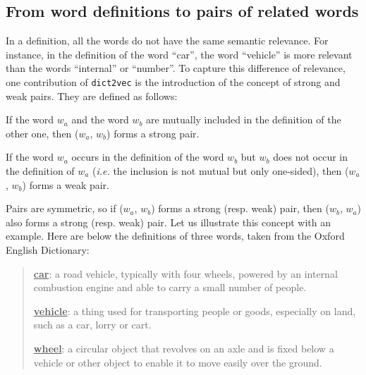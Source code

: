   \subsection{From word definitions to pairs of related words}
    \label{ch05:subsec:strong-weak-pairs}
    In a definition, all the words do not have the same semantic relevance. For
    instance, in the definition of the word ``car'', the word ``vehicle'' is
    more relevant than the words ``internal'' or ``number''. To capture
    this difference of relevance, one contribution of \texttt{dict2vec} is the
    introduction of the concept of strong and weak pairs. They are defined as
    follows:

    \theoremstyle{definition}
    \begin{definition}
      \label{ch05:def:strong-pair}
      If the word $w_a$ and the word $w_b$ are mutually included in the
      definition of the other one, then ($w_a$, $w_b$) forms a strong pair.
    \end{definition}

    \theoremstyle{definition}
    \begin{definition}
      \label{ch05:def:weak-pair}
      If the word $w_a$ occurs in the definition of the word $w_b$ but $w_b$
      does not occur in the definition of $w_a$ (\textit{i.e.} the inclusion is
      not mutual but only one-sided), then ($w_a$, $w_b$) forms a weak pair.
    \end{definition}

    Pairs are symmetric, so if ($w_a$, $w_b$) forms a strong (resp. weak) pair,
    then ($w_b$, $w_a$) also forms a strong (resp. weak) pair.  Let us
    illustrate this concept with an example. Here are below the definitions of
    three words, taken from the Oxford English Dictionary:

    \begin{quote}
      \textcolor{cobalt}{\textbf{\underline{car}}}: a road
      \textcolor{cerise}{vehicle}, typically with four \textcolor{jade}{wheels},
      powered by an internal combustion engine and able to carry a small number
      of people.

      \textcolor{cerise}{\textbf{\underline{vehicle}}}: a thing used for
      transporting people or goods, especially on land, such as a
      \textcolor{cobalt}{car}, lorry or cart.

      \textcolor{jade}{\textbf{\underline{wheel}}}: a circular object that
      revolves on an axle and is fixed below a \textcolor{cerise}{vehicle} or
      other object to enable it to move easily over the ground.
    \end{quote}

